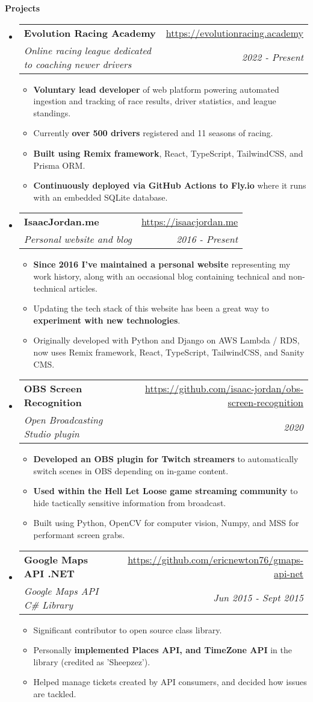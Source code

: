 \documentclass[letterpaper,11pt]{article}
\makeatletter
\newcommand{\resitem}[1]{\item #1 \vspace{-1pt}}
\newcommand{\resheading}[1]{{\large \colorbox{mygrey}{\begin{minipage}{\textwidth}{\textbf{#1 \vphantom{p\^{E}}}}\end{minipage}}}}
\newcommand{\ressubheading}[4]{
\begin{tabular*}{7.0in}{l@{\extracolsep{\fill}}r}
	\textbf{#1} & #2 \\
	\textit{#3} & \textit{#4} \\
\end{tabular*}\vspace{-6pt}}
\makeatother
\begin{document}
\resheading{Projects}
\begin{itemize}
	\item
		\ressubheading{Evolution Racing Academy}{\url{https://evolutionracing.academy}}
		{Online racing league dedicated to coaching newer drivers}{2022 - Present}
		\begin{itemize}
			\resitem{\textbf{Voluntary lead developer} of web platform powering automated ingestion and tracking of race results, driver statistics, and league standings.}
			\resitem{Currently \textbf{over 500 drivers} registered and 11 seasons of racing.}
			\resitem{\textbf{Built using Remix framework}, React, TypeScript, TailwindCSS, and Prisma ORM.}
			\resitem{\textbf{Continuously deployed via GitHub Actions to Fly.io} where it runs with an embedded SQLite database.}
		\end{itemize}

	\item
		\ressubheading{IsaacJordan.me}{\url{https://isaacjordan.me}}
		{Personal website and blog}{2016 - Present}
		\begin{itemize}
			\resitem{\textbf{Since 2016 I've maintained a personal website} representing my work history, along with an occasional blog containing technical and non-technical articles.}
			\resitem{Updating the tech stack of this website has been a great way to \textbf{experiment with new technologies}.}
			\resitem{Originally developed with Python and Django on AWS Lambda / RDS, now uses Remix framework, React, TypeScript, TailwindCSS, and Sanity CMS.}
		\end{itemize}

	\item
		\ressubheading{OBS Screen Recognition}{\url{https://github.com/isaac-jordan/obs-screen-recognition}}
		{Open Broadcasting Studio plugin}{2020}
		\begin{itemize}
			\resitem{\textbf{Developed an OBS plugin for Twitch streamers} to automatically switch scenes in OBS depending on in-game content.}
			\resitem{\textbf{Used within the Hell Let Loose game streaming community} to hide tactically sensitive information from broadcast.}
			\resitem{Built using Python, OpenCV for computer vision, Numpy, and MSS for performant screen grabs.}
		\end{itemize}

	\item
		\ressubheading{Google Maps API .NET}{\url{https://github.com/ericnewton76/gmaps-api-net}}
		{Google Maps API C\# Library}{Jun 2015 - Sept 2015}
		\begin{itemize}
			\resitem{Significant contributor to open source class library.}
			\resitem{Personally \textbf{implemented Places API, and TimeZone API} in the library (credited as 'Sheepzez').}
			\resitem{Helped manage tickets created by API consumers, and decided how issues are tackled.}
		\end{itemize}

\end{itemize}
\end{document}
